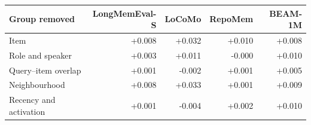 \begin{tabular}{@{}lrrrr@{}}\toprule
Group removed & LongMemEval-S & LoCoMo & RepoMem & BEAM-1M \\\midrule
Item & +0.008 & +0.032 & +0.010 & +0.008 \\
Role and speaker & +0.003 & +0.011 & -0.000 & +0.010 \\
Query--item overlap & +0.001 & -0.002 & +0.001 & +0.005 \\
Neighbourhood & +0.008 & +0.033 & +0.001 & +0.009 \\
Recency and activation & +0.001 & -0.004 & +0.002 & +0.010 \\
\bottomrule\end{tabular}